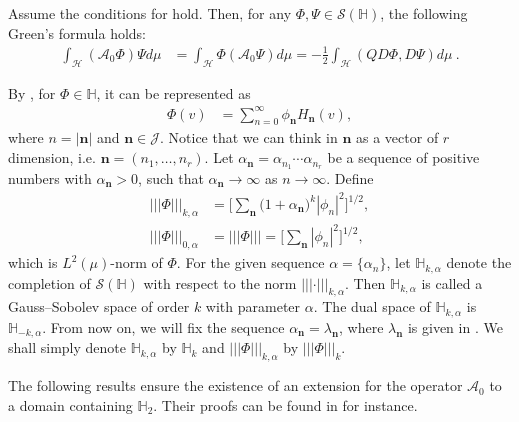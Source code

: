 \documentclass[review,onefignum,onetabnum]{siamart190516}
\begin{document}
    \begin{lemma}
        Assume the conditions for   hold. Then, for any
        $\Phi,\Psi\in \mathcal{S}(\mathbb{H})$, the following Green’s formula 
        holds:
        \begin{align}
             \int_{\mathcal{H}} (\mathcal{A}_0 \Phi)\Psi d\mu &=
                 \int_{\mathcal{H}} \Phi(\mathcal{A}_0 \Psi) d\mu=
                -\frac{1}{2}\int_{\mathcal{H}} (QD\Phi, D\Psi) d\mu \ .
        \end{align}
    \end{lemma}

        By , for $\Phi \in \mathbb{H}$, it can be represented as
    \begin{align} \label{s1.4}
        \Phi(v) &=
            \sum_{n=0}^\infty \phi_{\mathbf{n}} H_{\mathbf{n}}(v),
    \end{align}
    where $n = |\mathbf{n}|$ and $\mathbf{n}\in \mathcal{J}$. Notice that we can
    think in $\mathbf{n}$ as a vector of $r$ dimension, i.e.
    $\mathbf{n}=(n_1,\ldots,n_r)$.
    Let $\alpha_{\mathbf{n}} = \alpha_{n_1}\cdots \alpha_{n_r}$ be a sequence of
    positive numbers with $\alpha_{\mathbf{n}} > 0$, such that
    $\alpha_{\mathbf{n}} \rightarrow \infty$ as $n \rightarrow \infty$.
    Define
    \begin{align*}
         |||\Phi|||_{k,\alpha} 
            &= \Bigg[ \sum_{\mathbf{n}}
            \big(
                1 + \alpha_{\mathbf{n}}
            \big) ^ k |\phi_n |^2 \Bigg]^{1/2} ,
        \\
        |||\Phi|||_{0,\alpha} 
            &= |||\Phi|||=\Bigg[ \sum_{\mathbf{n}} |\phi_n|^2
        \Bigg]^{1/2},
    \end{align*}
    which is $L^2(\mu)$-norm of $\Phi$. For the given sequence
    $\alpha = \{\alpha_n \}$, let $\mathbb{H}_{k,\alpha}$ denote
    the completion of $\mathcal{S}(\mathbb{H})$ with respect to the norm
    $|||\cdot|||_{k,\alpha}$. Then $\mathbb{H}_{k,\alpha}$ is called
    a Gauss–Sobolev space of order $k$ with parameter $\alpha$. The dual space 
    of $\mathbb{H}_{k,\alpha}$ is $\mathbb{H}_{-k,\alpha}$.
    From now on, we will fix the sequence $\alpha_{\mathbf{n}} =
    \lambda_{\mathbf{n}} $, where $\lambda_{\mathbf{n}} $ is given in
    . We shall simply denote $\mathbb{H}_{k,\alpha}$ by 
    $\mathbb{H}_{k}$ and
    $ |||\Phi|||_{k,\alpha}$ by $|||\Phi|||_{k}$.

        The following results ensure the existence of an extension for the 
    operator $\mathcal{A}_0$ to a domain containing $\mathbb{H}_{2}$. Their
    proofs can be found in \cite{liu} for instance.
\end{document}
